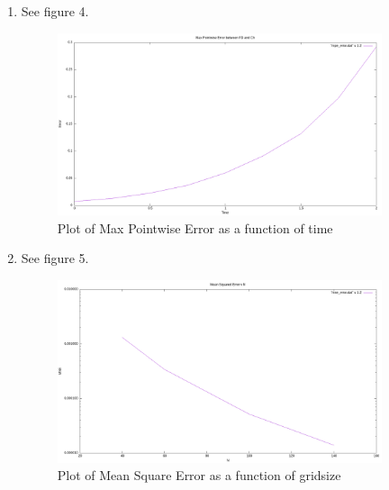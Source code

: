 \documentclass{article}
\begin{document}
\begin{enumerate}[label=\alph*)]
    \item See figure 4.
     \begin{figure}
        \centering
        \includegraphics[width=0.9\textwidth]{mpe.png}
        \caption{Plot of Max Pointwise Error as a function of time}
    \end{figure}
       
    \item See figure 5.
    \begin{figure}
        \centering
        \includegraphics[width=0.9\textwidth]{mse.png}
        \caption{Plot of Mean Square Error as a function of gridsize}
    \end{figure}



\end{enumerate}
\end{document}
